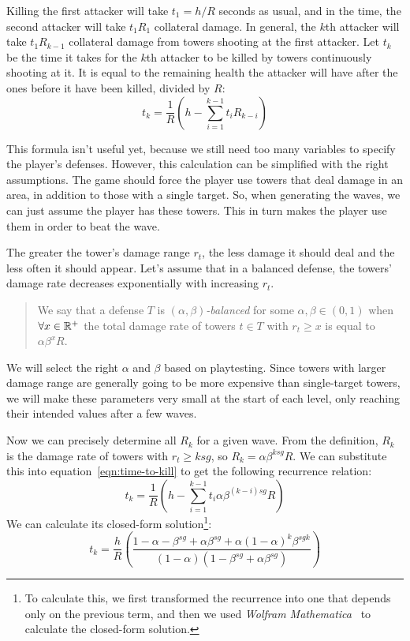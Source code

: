 Killing the first attacker will take $t_1 = h/R$ seconds as usual, and in the time, the second attacker will take $t_1 R_1$ collateral damage.
In general, the $k$th attacker will take $t_1 R_{k-1}$ collateral damage from towers shooting at the first attacker.
Let $t_k$ be the time it takes for the $k$th attacker to be killed by towers continuously shooting at it.
It is equal to the remaining health the attacker will have after the ones before it have been killed, divided by $R$:
\begin{equation}\label{eqn:time-to-kill}
    t_k = \frac{1}{R}\left(h - \sum_{i=1}^{k-1} t_i R_{k-i} \right)
\end{equation}

This formula isn't useful yet, because we still need too many variables to specify the player's defenses.
However, this calculation can be simplified with the right assumptions.
The game should force the player use towers that deal damage in an area, in addition to those with a single target.
So, when generating the waves, we can just assume the player has these towers.
This in turn makes the player use them in order to beat the wave.

The greater the tower's damage range $r_t$, the less damage it should deal and the less often it should appear.
Let's assume that in a balanced defense, the towers' damage rate decreases exponentially with increasing $r_t$.
\begin{quotation}
    We say that a defense $T$ is $(\alpha, \beta)$\emph{-balanced} for some $\alpha,\beta \in (0,1)$ when $\forall x \in \mathbb{R}^+$ the total damage rate of towers $t \in T$ with $r_t \geq x$ is equal to $\alpha\beta^x R$.
\end{quotation}
We will select the right $\alpha$ and $\beta$ based on playtesting.
Since towers with larger damage range are generally going to be more expensive than single-target towers, we will make these parameters very small at the start of each level, only reaching their intended values after a few waves.

Now we can precisely determine all $R_k$ for a given wave.
From the definition, $R_k$ is the damage rate of towers with $r_t \geq ksg$, so $R_k = \alpha\beta^{ksg} R$.
We can substitute this into equation~\ref{eqn:time-to-kill} to get the following recurrence relation:
\begin{equation}
    t_k = \frac{1}{R}\left(h - \sum_{i=1}^{k-1} t_i \alpha\beta^{(k-i)sg} R\right)
\end{equation}
We can calculate its closed-form solution\footnote{To calculate this, we first transformed the recurrence into one that depends only on the previous term, and then we used \emph{Wolfram Mathematica}~\cite{Mathematica} to calculate the closed-form solution.}:
\begin{equation}
    t_k = \frac{h}{R}\left(\frac{
            1-\alpha-\beta^{sg}+\alpha\beta^{sg}+\alpha(1-\alpha)^k\beta^{sgk}
        }{
            (1-\alpha)(1-\beta^{sg}+\alpha\beta^{sg})
        }\right)
\end{equation}

